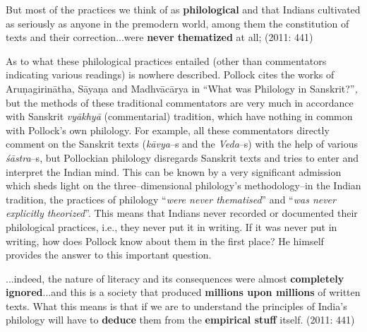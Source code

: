 
\begin{myquote}
But most of the practices we think of as \textbf{philological} and that Indians cultivated as seriously as anyone in the premodern world, among them the constitution of texts and their correction...were \textbf{never thematized} at all; (2011: 441)
\end{myquote}

As to what these philological practices entailed (other than commentators indicating various readings) is nowhere described. Pollock cites the works of Aruṇagirinātha, Sāyaṇa and Madhvācārya in “What was Philology in Sanskrit?”\textit{,} but the methods of these traditional commentators are very much in accordance with Sanskrit \textit{vyākhyā} (commentarial) tradition, which have nothing in common with Pollock’s own philology. For example, all these commentators directly comment on the Sanskrit texts (\textit{kāvya}–s and the \textit{Veda}–s) with the help of various\textit{ śāstra}–s, but Pollockian philology disregards Sanskrit texts and tries to enter and interpret the Indian mind. This can be known by a very significant admission which sheds light on the three–dimensional philology’s methodology–in the Indian tradition, the practices of philology “\textit{were never thematised}” and “\textit{was never explicitly theorized}”. This means that Indians never recorded or documented their philological practices, i.e., they never put it in writing. If it was never put in writing, how does Pollock know about them in the first place? He himself provides the answer to this important question.

\begin{myquote}
...indeed, the nature of literacy and its consequences were almost \textbf{completely ignored}...and this is a society that produced \textbf{millions upon millions} of written texts. What this means is that if we are to understand the principles of India’s philology will have to \textbf{deduce} them from the \textbf{empirical stuff} itself. (2011: 441)
\end{myquote}


